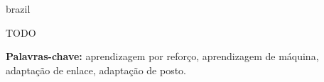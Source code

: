 \begin{resumo}[Resumo]
\begin{otherlanguage*}{brazil}

\setlength\parindent{24pt}
TODO
%
%
%
%

\vspace*{2ex}
\textbf{Palavras-chave: } aprendizagem por reforço, aprendizagem de máquina, adaptação de enlace, adaptação de posto.

\end{otherlanguage*}
\end{resumo}
